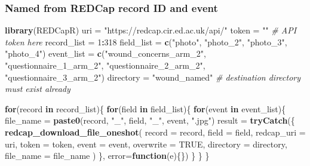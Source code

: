 \documentclass[]{book}
\newenvironment{Shaded}{\begin{snugshade}}{\end{snugshade}}
\newcommand{\CommentTok}[1]{\textcolor[rgb]{0.56,0.35,0.01}{\textit{#1}}}
\newcommand{\ControlFlowTok}[1]{\textcolor[rgb]{0.13,0.29,0.53}{\textbf{#1}}}
\newcommand{\DataTypeTok}[1]{\textcolor[rgb]{0.13,0.29,0.53}{#1}}
\newcommand{\DecValTok}[1]{\textcolor[rgb]{0.00,0.00,0.81}{#1}}
\newcommand{\KeywordTok}[1]{\textcolor[rgb]{0.13,0.29,0.53}{\textbf{#1}}}
\newcommand{\NormalTok}[1]{#1}
\newcommand{\OperatorTok}[1]{\textcolor[rgb]{0.81,0.36,0.00}{\textbf{#1}}}
\newcommand{\OtherTok}[1]{\textcolor[rgb]{0.56,0.35,0.01}{#1}}
\newcommand{\StringTok}[1]{\textcolor[rgb]{0.31,0.60,0.02}{#1}}
\theoremstyle{definition}
\theoremstyle{definition}
\theoremstyle{definition}
\theoremstyle{remark}
\begin{document}
\hypertarget{named-from-redcap-record-id-and-event}{%
\subsubsection{Named from REDCap record ID and
event}\label{named-from-redcap-record-id-and-event}}

\begin{Shaded}
\begin{Highlighting}[]
\KeywordTok{library}\NormalTok{(REDCapR)}
\NormalTok{uri =}\StringTok{ "https://redcap.cir.ed.ac.uk/api/"}
\NormalTok{token =}\StringTok{ ""} \CommentTok{# API token here}
\NormalTok{record_list =}\StringTok{ }\DecValTok{1}\OperatorTok{:}\DecValTok{318}
\NormalTok{field_list =}\StringTok{ }\KeywordTok{c}\NormalTok{(}\StringTok{"photo"}\NormalTok{, }\StringTok{"photo_2"}\NormalTok{, }\StringTok{"photo_3"}\NormalTok{, }\StringTok{"photo_4"}\NormalTok{)}
\NormalTok{event_list =}\StringTok{ }\KeywordTok{c}\NormalTok{(}\StringTok{"wound_concerns_arm_2"}\NormalTok{, }\StringTok{"questionnaire_1_arm_2"}\NormalTok{,}
               \StringTok{"questionnaire_2_arm_2"}\NormalTok{, }\StringTok{"questionnaire_3_arm_2"}\NormalTok{)}
\NormalTok{directory =}\StringTok{ "wound_named"} \CommentTok{# destination directory must exist already}

\ControlFlowTok{for}\NormalTok{(record }\ControlFlowTok{in}\NormalTok{ record_list)\{}
  \ControlFlowTok{for}\NormalTok{(field }\ControlFlowTok{in}\NormalTok{ field_list)\{}
    \ControlFlowTok{for}\NormalTok{(event }\ControlFlowTok{in}\NormalTok{ event_list)\{}
\NormalTok{      file_name =}\StringTok{ }\KeywordTok{paste0}\NormalTok{(record, }\StringTok{"_"}\NormalTok{, field, }\StringTok{"_"}\NormalTok{, event, }\StringTok{".jpg"}\NormalTok{)}
\NormalTok{      result =}\StringTok{ }
\StringTok{        }\KeywordTok{tryCatch}\NormalTok{(\{}
          \KeywordTok{redcap_download_file_oneshot}\NormalTok{(}
            \DataTypeTok{record        =}\NormalTok{ record,}
            \DataTypeTok{field         =}\NormalTok{ field,}
            \DataTypeTok{redcap_uri    =}\NormalTok{ uri,}
            \DataTypeTok{token         =}\NormalTok{ token,}
            \DataTypeTok{event         =}\NormalTok{ event,}
            \DataTypeTok{overwrite     =} \OtherTok{TRUE}\NormalTok{,}
            \DataTypeTok{directory     =}\NormalTok{ directory,}
            \DataTypeTok{file_name     =}\NormalTok{ file_name}
\NormalTok{          )}
\NormalTok{        \}, }\DataTypeTok{error=}\ControlFlowTok{function}\NormalTok{(e)\{\})}
\NormalTok{    \}}
\NormalTok{  \}}
\NormalTok{\}}
\end{Highlighting}
\end{Shaded}
\end{document}
